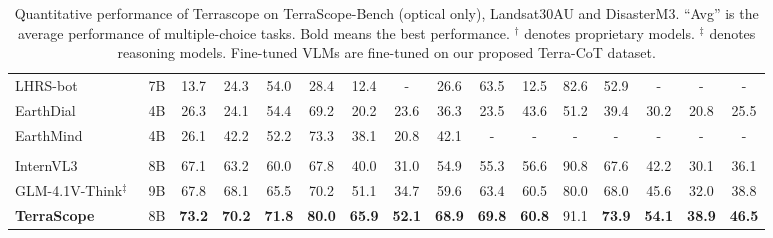 \begin{table}[!t]
\begin{tabular}{lc|ccccccc|cccc|ccc}
    LHRS-bot~\cite{muhtar2024lhrs}       & 7B & 13.7 & 24.3 & 54.0 & 28.4 & 12.4 & - & 26.6 & 63.5 & 12.5 & 82.6 & 52.9 & - & - & - \\
    EarthDial~\cite{soni2024earthdial}       & 4B & 26.3 & 24.1 & 54.4 & 69.2 & 20.2 & 23.6 & 36.3 & 23.5 & 43.6 & 51.2 & 39.4 & 30.2 & 20.8 & 25.5 \\
    EarthMind~\cite{shu2025earthmind}       & 4B &26.1 & 42.2 & 52.2 &73.3 & 38.1 & 20.8 & 42.1 & - & - & - & - & - & - & - \\
    \midrule
    \rowcolor{gray!15}\multicolumn{16}{c}{\textbf{Fine-tuned VLMs}} \\
    InternVL3~\cite{zhu2025internvl3}          & 8B &67.1 & 63.2 & 60.0 & 67.8 & 40.0 & 31.0 & 54.9 & 55.3 & 56.6 & 90.8 & 67.6 & 42.2 & 30.1 & 36.1 \\
    GLM-4.1V-Think$^{\ddagger}$~\cite{hong2025glm} &9B & 67.8 & 68.1 & 65.5 & 70.2 & 51.1 & 34.7 & 59.6 & 63.4 & 60.5 & 80.0 & 68.0 & 45.6 & 32.0 & 38.8 \\
    \midrule
    \rowcolor{ModelGreen}\textbf{TerraScope} & 8B & \textbf{73.2} & \textbf{70.2} & \textbf{71.8} & \textbf{80.0} & \textbf{65.9} & \textbf{52.1} & \textbf{68.9} & \textbf{69.8} & \textbf{60.8} & 91.1 & \textbf{73.9} & \textbf{54.1} & \textbf{38.9} & \textbf{46.5} \\
    \bottomrule
    \end{tabular}
    \vspace{-2mm}
    \caption{Quantitative performance of Terrascope on TerraScope-Bench (optical only), Landsat30AU and DisasterM3. ``Avg'' is the average performance of multiple-choice tasks. Bold means the best performance. $^{\dagger}$ denotes proprietary models. $^{\ddagger}$ denotes reasoning models. Fine-tuned VLMs are fine-tuned on our proposed Terra-CoT dataset.}
    \vspace{-5mm}
    \label{tab:eo_results_v3}
\end{table}
